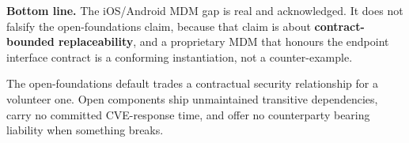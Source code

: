 \documentclass[11pt,a4paper,twoside]{book}
\newcommand{\keyword}[1]{\textbf{#1}}
\begin{document}
\begin{answerbox}[Response O2.1]
\textbf{Bottom line.} The iOS/Android MDM gap is real and acknowledged. It
does not falsify the open-foundations claim, because that claim is about
\keyword{contract-bounded replaceability}, and a proprietary MDM that honours
the endpoint interface contract is a conforming instantiation, not a
counter-example.
\end{answerbox}

\begin{questionbox}
The open-foundations default trades a contractual security
relationship for a volunteer one. Open components ship unmaintained
transitive dependencies, carry no committed CVE-response time, and
offer no counterparty bearing liability when something breaks.
\end{questionbox}
\end{document}
